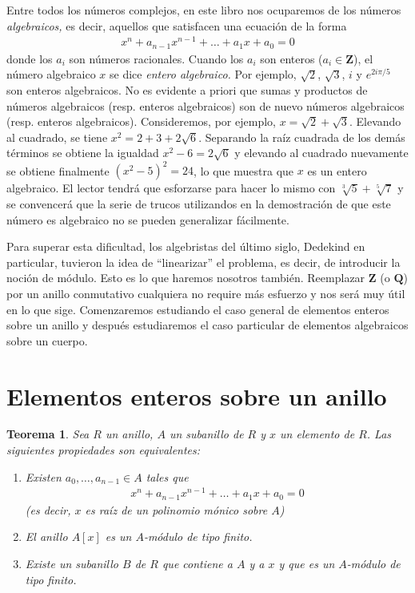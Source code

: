 \documentclass[10pt,oneside,bibtotoc,smallheadings,leqno,a5paper,DIV=12]{scrbook}
\newcommand{\QQ}{\mathbf{Q}}
\newcommand{\ZZ}{\mathbf{Z}}
\numberwithin{equation}{section}
\theoremstyle{defi}
\theoremstyle{enonce}
\newtheorem{theorem}{Teorema}
\theoremstyle{rem}
\numberwithin{theorem}{section}
\numberwithin{proposition}{section}
\numberwithin{definition}{section}
\numberwithin{lemma}{section}
\numberwithin{corollary}{section}
\numberwithin{example}{section}
\numberwithin{footnote}{section}%
\begin{document}
Entre todos los n\'umeros complejos, en este libro nos ocuparemos de los n\'umeros
{\em algebraicos,} es decir, aquellos que satisfacen una ecuaci\'on de la forma
\begin{gather*}
x^{n}+a_{n-1}x^{n-1}+\dots+a_{1}x+a_{0} = 0
\end{gather*}
donde los $a_{i}$ son n\'umeros racionales. Cuando los $a_{i}$ son enteros
($a_{i}\in\ZZ$), el n\'umero algebraico $x$ se dice {\em entero algebraico.}
Por ejemplo, $\sqrt{2}$, $\sqrt{3}$, $i$ y $e^{2i\pi/5}$ son enteros algebraicos. No es evidente
a priori que sumas y productos de n\'umeros algebraicos (resp. enteros algebraicos) son
de nuevo n\'umeros algebraicos (resp. enteros algebraicos). Consideremos, por ejemplo,
$x = \sqrt{2}+\sqrt{3}$. Elevando al cuadrado, se tiene $x^{2} = 2+3+2\sqrt{6}$.
Separando la ra\'iz cuadrada de los dem\'as t\'erminos se obtiene la igualdad $x^{2}-6=2\sqrt{6}$ y
elevando al cuadrado nuevamente se obtiene finalmente $(x^{2}-5)^{2}=24$, lo que muestra que
$x$ es un entero algebraico. El lector tendr\'a que esforzarse para hacer lo mismo con
$\sqrt[3]{5}+\sqrt[5]{7}$ y se convencer\'a que la serie de trucos utilizandos en la demostraci\'on de
que este n\'umero es algebraico no se pueden generalizar f\'acilmente.

Para superar esta dificultad, los algebristas del \'ultimo siglo, Dedekind en particular, tuvieron
la idea de ``linearizar'' el problema, es decir, de introducir la noci\'on de m\'odulo. Esto es lo que haremos nosotros
tambi\'en. Reemplazar $\ZZ$ (o $\QQ$) por un anillo conmutativo cualquiera no require m\'as esfuerzo
y nos ser\'a muy \'util en lo que sige. Comenzaremos estudiando el caso general de elementos enteros sobre un
anillo y despu\'es estudiaremos el caso particular de elementos algebraicos sobre un cuerpo.

\section{Elementos enteros sobre un anillo}\label{sec2.1}

\begin{theorem}\label{teo2.1.1}
Sea $R$ un anillo, $A$ un subanillo de $R$ y $x$ un elemento de $R$. Las siguientes propiedades son equivalentes:
\begin{enumerate}
\item Existen $a_{0},\dots,a_{n-1}\in A$ tales que
\begin{gather}\label{eq-2.1-1}
x^{n}+a_{n-1}x^{n-1}+\dots+a_{1}x+a_{0} = 0
\end{gather}
(es decir, $x$ es ra\'iz de un polinomio m\'onico sobre $A$)
\item El anillo $A[x]$ es un $A$-m\'odulo de tipo finito.
\item Existe un subanillo $B$ de $R$ que contiene a $A$ y a $x$ y que es un $A$-m\'odulo
de tipo finito.
\end{enumerate}
\end{theorem}
\end{document}
